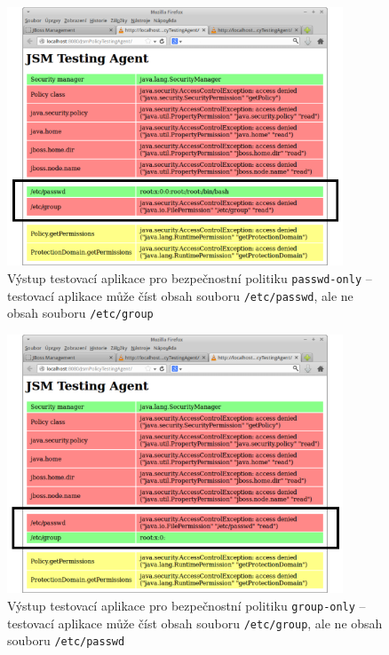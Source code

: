 \begin{figure}[ht]
  \centering
  \includegraphics[width=10cm]{fig/test-passwd}
  \caption{Výstup testovací aplikace pro bezpečnostní politiku {\tt passwd-only} -- testovací aplikace může číst obsah souboru {\tt /etc/passwd}, ale ne obsah souboru {\tt /etc/group}}
  \label{testPasswd}
\end{figure}
\begin{figure}[ht]
  \centering
  \includegraphics[width=10cm]{fig/test-group}
  \caption{Výstup testovací aplikace pro bezpečnostní politiku {\tt group-only} -- testovací aplikace může číst obsah souboru {\tt /etc/group}, ale ne obsah souboru {\tt /etc/passwd}}
  \label{testGroup}
\end{figure}


